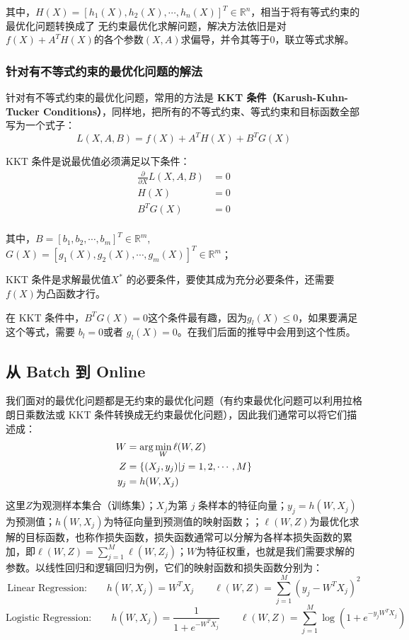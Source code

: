 \documentclass[12pt]{article}
\begin{document}
其中，$H(X) = [h_1(X), h_2(X), \cdots, h_n(X)]^T \in \mathbb{R}^n$，相当于将有等式约束的最优化问题转换成了 无约束最优化求解问题，解决方法依旧是对$f(X) + A^TH(X)$的各个参数$(X,A)$求偏导，并令其等于0，联立等式求解。

\subsubsection{针对有不等式约束的最优化问题的解法}
针对有不等式约束的最优化问题，常用的方法是\textbf{ KKT 条件（Karush-Kuhn-Tucker Conditions）}，同样地，把所有的不等式约束、等式约束和目标函数全部写为一个式子：
$$
L(X,A,B) = f(X) + A^TH(X) + B^TG(X)
$$

KKT 条件是说最优值必须满足以下条件：
\begin{align*}
\frac{\partial}{\partial X} L(X,A,B) &= 0 \\
H(X) &= 0 \\
B^TG(X) &= 0\\
\end{align*}

其中，$B = [b_1, b_2, \cdots, b_m]^T \in \mathbb{R}^m$, $G(X) = [g_1(X), g_2(X), \cdots, g_m(X)]^T \in \mathbb{R}^m$；

KKT 条件是求解最优值$X^*$ 的必要条件，要使其成为充分必要条件，还需要$f(X)$为凸函数才行。

在 KKT 条件中，$B^TG(X) = 0$这个条件最有趣，因为$g_l(X) \le 0$，如果要满足这个等式，需要 $b_l = 0$或者 $g_l(X) = 0$。在我们后面的推导中会用到这个性质。

\subsection{从 Batch 到 Online}
我们面对的最优化问题都是无约束的最优化问题（有约束最优化问题可以利用拉格朗日乘数法或 KKT 条件转换成无约束最优化问题），因此我们通常可以将它们描述成：
\begin{align}
W &= \arg\min_W \ell(W,Z) \label{Eq_Optimize_W_Base}\\
Z &= \{(X_j, y_j) | j = 1, 2, \cdots, M\} \notag\\
y_j &= h(W, X_j) \notag
\end{align}

这里$Z$为观测样本集合（训练集）；$X_j$为第 $j$ 条样本的特征向量；$y_j = h(W, X_j)$为预测值；$h(W, X_j)$为特征向量到预测值的映射函数；；$\ell(W,Z)$为最优化求解的目标函数，也称作损失函数，损失函数通常可以分解为各样本损失函数的累加，即$\ell(W,Z) = \sum_{j=1}^M\ell(W,Z_j)$；$W$为特征权重，也就是我们需要求解的参数。以线性回归和逻辑回归为例，它们的映射函数和损失函数分别为：
$$
\text{Linear Regression:}\qquad h(W,X_j) = W^TX_j  \qquad \ell(W,Z) = \sum_{j=1}^M(y_j - W^TX_j)^2
$$
$$
\text{Logistic Regression:}\qquad h(W,X_j) = \frac{1}{1 + e^{-W^TX_j}}  \qquad \ell(W,Z) = \sum_{j=1}^M\log(1 + e^{-y_jW^TX_j})
$$
\end{document}
